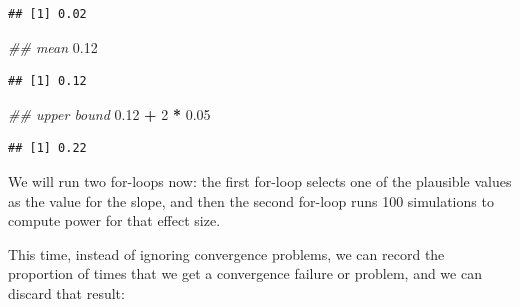 \documentclass[12pt,]{krantz}
\newenvironment{Shaded}{\begin{snugshade}}{\end{snugshade}}
\newcommand{\CommentTok}[1]{\textcolor[rgb]{0.56,0.35,0.01}{\textit{#1}}}
\newcommand{\DecValTok}[1]{\textcolor[rgb]{0.00,0.00,0.81}{#1}}
\newcommand{\FloatTok}[1]{\textcolor[rgb]{0.00,0.00,0.81}{#1}}
\newcommand{\OperatorTok}[1]{\textcolor[rgb]{0.81,0.36,0.00}{\textbf{#1}}}
\newcommand{\StringTok}[1]{\textcolor[rgb]{0.31,0.60,0.02}{#1}}
\begin{document}
\begin{verbatim}
## [1] 0.02
\end{verbatim}

\begin{Shaded}
\begin{Highlighting}[]
\CommentTok{## mean}
\FloatTok{0.12}
\end{Highlighting}
\end{Shaded}

\begin{verbatim}
## [1] 0.12
\end{verbatim}

\begin{Shaded}
\begin{Highlighting}[]
\CommentTok{## upper bound}
\FloatTok{0.12} \OperatorTok{+}\StringTok{ }\DecValTok{2} \OperatorTok{*}\StringTok{ }\FloatTok{0.05}
\end{Highlighting}
\end{Shaded}

\begin{verbatim}
## [1] 0.22
\end{verbatim}

We will run two for-loops now: the first for-loop selects one of the plausible values as the value for the slope, and then the second for-loop runs 100 simulations to compute power for that effect size.

This time, instead of ignoring convergence problems, we can record the proportion of times that we get a convergence failure or problem, and we can discard that result:
\end{document}
